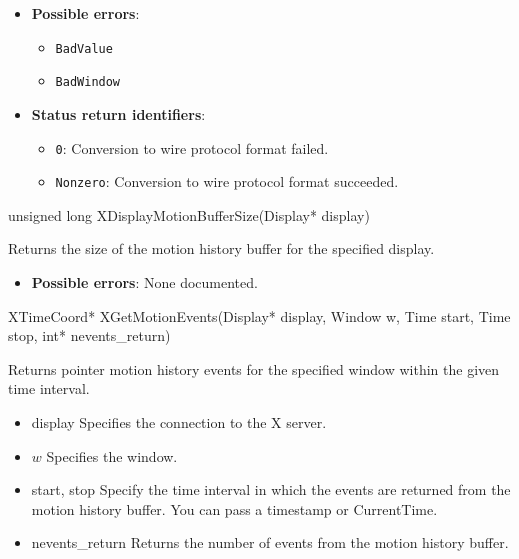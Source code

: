 \documentclass{report}
\begin{document}
\begin{itemize}
        \begin{itemize}
            \item \textbf{Possible errors}:
                \begin{itemize}
                    \item \texttt{BadValue}
                    \item \texttt{BadWindow}
                \end{itemize}
            \item \textbf{Status return identifiers}:
                \begin{itemize}
                    \item \texttt{0}: Conversion to wire protocol format failed.
                    \item \texttt{Nonzero}: Conversion to wire protocol format succeeded.
                \end{itemize}
        \end{itemize}

        \begin{cppcode}
            unsigned long XDisplayMotionBufferSize(Display* display)
        \end{cppcode}
        \bigbreak \noindent
        Returns the size of the motion history buffer for the specified display.

        \begin{itemize}
            \item \textbf{Possible errors}: None documented.
        \end{itemize}

        \begin{cppcode}
            XTimeCoord* XGetMotionEvents(Display* display, Window w, Time start, Time stop, int* nevents_return)
        \end{cppcode}
        \bigbreak \noindent
        Returns pointer motion history events for the specified window within the given time interval.

        \begin{itemize}
            \item display Specifies the connection to the X server.
            \item $w$ Specifies the window.
            \item start, stop Specify the time interval in which the events are returned from the motion history buffer. You can pass a timestamp or CurrentTime.
            \item nevents\_return Returns the number of events from the motion history buffer.
        \end{itemize}


\end{itemize}
\end{document}
